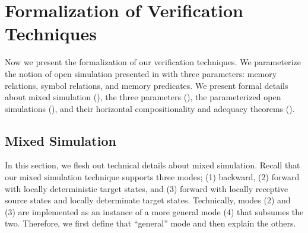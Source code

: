 \section{Formalization of Verification Techniques}
\label{sec:compiler:technique}

Now we present the formalization of our verification techniques.
We parameterize the notion of open simulation presented in
 with three parameters: memory relations, symbol
relations, and memory predicates.  We present formal details about
mixed simulation (),
the three parameters (),
the parameterized open simulations (), and
their horizontal compositionality and adequacy theorems ().

\subsection{Mixed Simulation}
\label{sec:main-verification:mixedsim}
In this section, we flesh out technical details about mixed simulation.
Recall that our mixed simulation technique supports three modes; (1) backward, (2) forward with locally deterministic target states, and (3) forward with locally receptive source states and locally determinate target states.
Technically, modes (2) and (3) are implemented as an instance of a more general mode (4) that subsumes the two.
Therefore, we first define that ``general'' mode and then explain the others.

